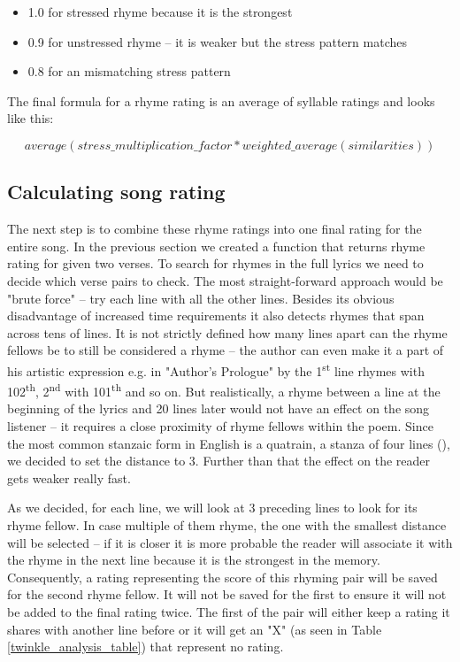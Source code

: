 \begin{itemize}
	\item 1.0 for stressed rhyme because it is the strongest
	
	\item 0.9 for unstressed rhyme -- it is weaker but the stress pattern matches
	
	\item 0.8 for an mismatching stress pattern
\end{itemize}


The final formula for a rhyme rating is an average of syllable ratings and looks like this:

\[average(stress\_multiplication\_factor*weighted\_average(similarities))\]


\subsection{Calculating song rating}

The next step is to combine these rhyme ratings into one final rating for the entire song. In the previous section we created a function that returns rhyme rating for given two verses. To search for rhymes in the full lyrics we need to decide which verse pairs to check. The most straight-forward approach would be "brute force" -- try each line with all the other lines. Besides its obvious disadvantage of increased time requirements it also detects rhymes that span across tens of lines. It is not strictly defined how many lines apart can the rhyme fellows be to still be considered a rhyme -- the author can even make it a part of his artistic expression  e.g. in "Author's Prologue" by \cite{thomas1952author} the 1\textsuperscript{st} line rhymes with 102\textsuperscript{th}, 2\textsuperscript{nd} with 101\textsuperscript{th} and so on. But realistically, a rhyme between a line at the beginning of the lyrics and 20 lines later would not have an effect on the song listener -- it requires a close proximity of rhyme fellows within the poem. Since the most common stanzaic form in English is a quatrain, a stanza of four lines (\cite{eastman1970norton}), we decided to set the distance to 3. Further than that the effect on the reader gets weaker really fast. 

As we decided, for each line, we will look at 3 preceding lines to look for its rhyme fellow. In case multiple of them rhyme, the one with the smallest distance will be selected -- if it is closer it is more probable the reader will associate it with the rhyme in the next line because it is the strongest in the memory. Consequently, a rating representing the score of this rhyming pair will be saved for the second rhyme fellow. It will not be saved for the first to ensure it will not be added to the final rating twice. The first of the pair will either keep a rating it shares with another line before or it will get an "X" (as seen in Table \ref{twinkle_analysis_table}) that represent no rating. 

